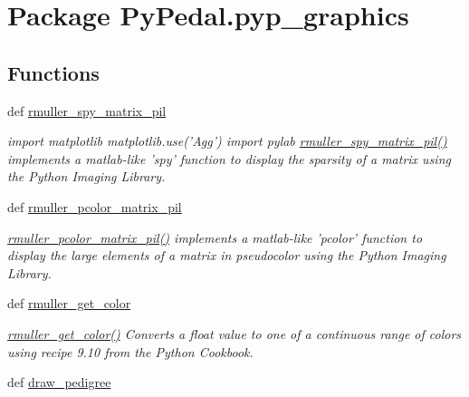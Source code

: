\hypertarget{namespacePyPedal_1_1pyp__graphics}{
\section{Package Py\-Pedal.pyp\_\-graphics}
\label{namespacePyPedal_1_1pyp__graphics}
}


\subsection*{Functions}
\begin{CompactItemize}
\item 
def \hyperlink{namespacePyPedal_1_1pyp__graphics_025ff5088109e49fc7936da00a433d60}{rmuller\_\-spy\_\-matrix\_\-pil}
\begin{CompactList}\small\item\em import matplotlib matplotlib.use('Agg') import pylab \hyperlink{namespacePyPedal_1_1pyp__graphics_025ff5088109e49fc7936da00a433d60}{rmuller\_\-spy\_\-matrix\_\-pil()} implements a matlab-like 'spy' function to display the sparsity of a matrix using the Python Imaging Library. \item\end{CompactList}\item 
def \hyperlink{namespacePyPedal_1_1pyp__graphics_b89e2534bdd5f0e0e57778f11e056007}{rmuller\_\-pcolor\_\-matrix\_\-pil}
\begin{CompactList}\small\item\em \hyperlink{namespacePyPedal_1_1pyp__graphics_b89e2534bdd5f0e0e57778f11e056007}{rmuller\_\-pcolor\_\-matrix\_\-pil()} implements a matlab-like 'pcolor' function to display the large elements of a matrix in pseudocolor using the Python Imaging Library. \item\end{CompactList}\item 
def \hyperlink{namespacePyPedal_1_1pyp__graphics_3fb74d0dd1a9d4c263ac96c4deb92601}{rmuller\_\-get\_\-color}
\begin{CompactList}\small\item\em \hyperlink{namespacePyPedal_1_1pyp__graphics_3fb74d0dd1a9d4c263ac96c4deb92601}{rmuller\_\-get\_\-color()} Converts a float value to one of a continuous range of colors using recipe 9.10 from the Python Cookbook. \item\end{CompactList}\item 
def \hyperlink{namespacePyPedal_1_1pyp__graphics_60eaf4bd218e2b1f32385ce9e6b8e066}{draw\_\-pedigree}

\end{CompactItemize}
